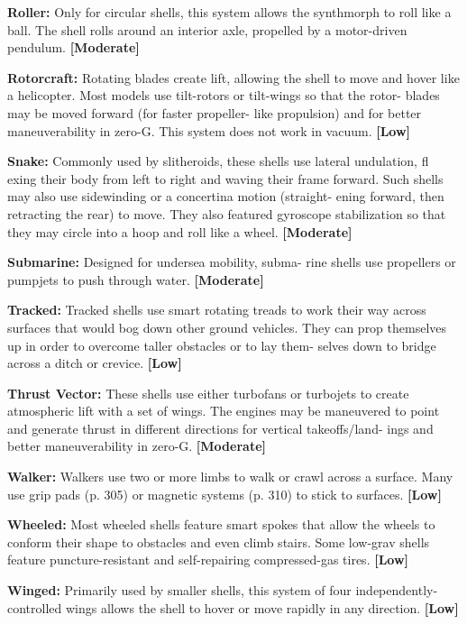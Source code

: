 \textbf{Roller:} Only for circular shells, this system allows 
the synthmorph to roll like a ball. The shell rolls 
around an interior axle, propelled by a motor-driven 
pendulum. \textbf{[Moderate]}

\textbf{Rotorcraft:} Rotating blades create lift, allowing 
the shell to move and hover like a helicopter. Most 
models use tilt-rotors or tilt-wings so that the rotor-
blades may be moved forward (for faster propeller-
like propulsion) and for better maneuverability in 
zero-G. This system does not work in vacuum. \textbf{[Low]}

\textbf{Snake:} Commonly used by slitheroids, these shells 
use lateral undulation, fl exing their body from left to 
right and waving their frame forward. Such shells may 
also use sidewinding or a concertina motion (straight-
ening forward, then retracting the rear) to move. They 
also featured gyroscope stabilization so that they may 
circle into a hoop and roll like a wheel. \textbf{[Moderate]}

\textbf{Submarine:} Designed for undersea mobility, subma-
rine shells use propellers or pumpjets to push through 
water. \textbf{[Moderate]}

\textbf{Tracked:} Tracked shells use smart rotating treads to 
work their way across surfaces that would bog down 
other ground vehicles. They can prop themselves up 
in order to overcome taller obstacles or to lay them-
selves down to bridge across a ditch or crevice. \textbf{[Low]}

\textbf{Thrust Vector:} These shells use either turbofans or 
turbojets to create atmospheric lift with a set of wings. 
The engines may be maneuvered to point and generate 
thrust in different directions for vertical takeoffs/land-
ings and better maneuverability in zero-G. \textbf{[Moderate]}

\textbf{Walker:} Walkers use two or more limbs to walk or 
crawl across a surface. Many use grip pads (p. 305) or 
magnetic systems (p. 310) to stick to surfaces. \textbf{[Low]}

\textbf{Wheeled:} Most wheeled shells feature smart 
spokes that allow the wheels to conform their shape 
to obstacles and even climb stairs. Some low-grav 
shells feature puncture-resistant and self-repairing 
compressed-gas tires. \textbf{[Low]}

\textbf{Winged:} Primarily used by smaller shells, this system 
of four independently-controlled wings allows the 
shell to hover or move rapidly in any direction. \textbf{[Low]}

